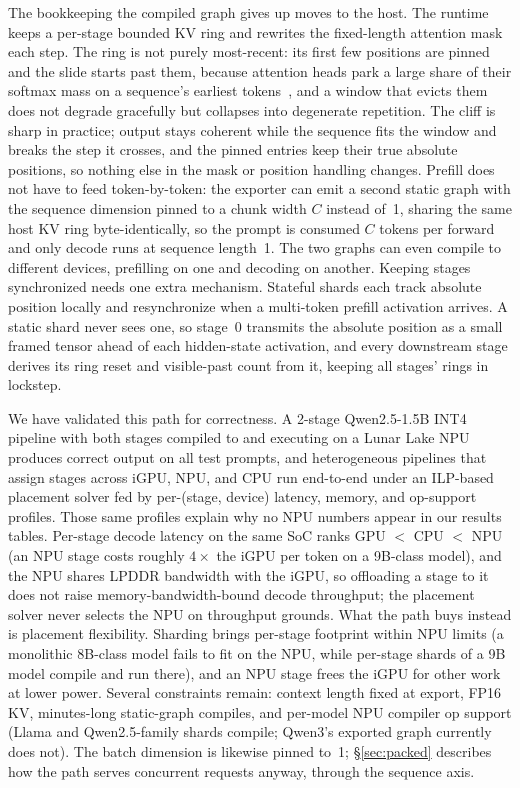 \documentclass[11pt]{article}
\begin{document}
The bookkeeping the compiled graph gives up moves to the host. The runtime keeps a per-stage bounded KV ring and rewrites the fixed-length attention mask each step. The ring is not purely most-recent: its first few positions are pinned and the slide starts past them, because attention heads park a large share of their softmax mass on a sequence's earliest tokens~\cite{xiao2024streamingllm}, and a window that evicts them does not degrade gracefully but collapses into degenerate repetition. The cliff is sharp in practice; output stays coherent while the sequence fits the window and breaks the step it crosses, and the pinned entries keep their true absolute positions, so nothing else in the mask or position handling changes. Prefill does not have to feed token-by-token: the exporter can emit a second static graph with the sequence dimension pinned to a chunk width $C$ instead of~1, sharing the same host KV ring byte-identically, so the prompt is consumed $C$ tokens per forward and only decode runs at sequence length~1. The two graphs can even compile to different devices, prefilling on one and decoding on another. Keeping stages synchronized needs one extra mechanism. Stateful shards each track absolute position locally and resynchronize when a multi-token prefill activation arrives. A static shard never sees one, so stage~0 transmits the absolute position as a small framed tensor ahead of each hidden-state activation, and every downstream stage derives its ring reset and visible-past count from it, keeping all stages' rings in lockstep.

We have validated this path for correctness. A 2-stage Qwen2.5-1.5B INT4 pipeline with both stages compiled to and executing on a Lunar Lake NPU produces correct output on all test prompts, and heterogeneous pipelines that assign stages across iGPU, NPU, and CPU run end-to-end under an ILP-based placement solver fed by per-(stage, device) latency, memory, and op-support profiles. Those same profiles explain why no NPU numbers appear in our results tables. Per-stage decode latency on the same SoC ranks GPU $<$ CPU $<$ NPU (an NPU stage costs roughly $4\times$ the iGPU per token on a 9B-class model), and the NPU shares LPDDR bandwidth with the iGPU, so offloading a stage to it does not raise memory-bandwidth-bound decode throughput; the placement solver never selects the NPU on throughput grounds. What the path buys instead is placement flexibility. Sharding brings per-stage footprint within NPU limits (a monolithic 8B-class model fails to fit on the NPU, while per-stage shards of a 9B model compile and run there), and an NPU stage frees the iGPU for other work at lower power. Several constraints remain: context length fixed at export, FP16 KV, minutes-long static-graph compiles, and per-model NPU compiler op support (Llama and Qwen2.5-family shards compile; Qwen3's exported graph currently does not). The batch dimension is likewise pinned to~1; \S\ref{sec:packed} describes how the path serves concurrent requests anyway, through the sequence axis.
\end{document}
